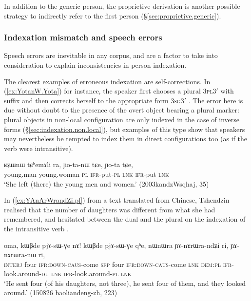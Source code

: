 In addition to the generic person, the proprietive derivation is another possible strategy to indirectly refer to the first person (§\ref{sec:proprietive.generic}).
 
\subsubsection{Indexation mismatch and speech errors} \label{sec:mismatch.errors}
Speech errors are inevitable in any corpus, and are a factor to take into consideration to explain inconsistencies in person indexation. 

The clearest examples of erroneous indexation are self-corrections. In (\ref{ex:YotanW.Yota}) for instance, the speaker first chooses a plural \textsc{3pl}\fl{}3$'$ with  suffix and then corrects herself to the appropriate form \textsc{3sg}\fl{}3$'$ . The error here is due without doubt to the presence of the overt object  bearing a plural marker: plural objects in non-local configuration are only indexed in the case of inverse forms (§\ref{sec:indexation.non.local}), but examples of this type show that speakers may nevertheless be tempted to index them in direct configurations too (as if the verb were intransitive).

\begin{exe}
\ex \label{ex:YotanW.Yota}
\gll  ʁʑɯnɯ tɕʰemɤli ra, ɲo-ta-nɯ tɕe, ɲo-ta tɕe, \\
young.man young.woman \textsc{pl} \textsc{ifr}-put-\textsc{pl} \textsc{lnk} \textsc{ifr}-put \textsc{lnk} \\
\glt `She left (there) the young men and women.' (2003kandzWsqhaj, 35)
\end{exe} 

In (\ref{ex:YAnArWrandZi.pl}) from a text translated from Chinese, Tshendzin realised that the number of daughters was different from what she had  remembered, and hesitated between the dual and the plural on the indexation of the intransitive verb .

\begin{exe}
\ex \label{ex:YAnArWrandZi.pl}
\gll oma, kɯβde pjɤ-sɯ-ɣe nɤ! kɯβde pjɤ-sɯ-ɣe qʰe, nɯnɯra ɲɤ-nɤrɯra-ndʑi ri, ɲɤ-nɤrɯra-nɯ ri, \\
\textsc{interj} four \textsc{ifr}:\textsc{down}-\textsc{caus}-come \textsc{sfp} four \textsc{ifr}:\textsc{down}-\textsc{caus}-come \textsc{lnk} \textsc{dem}:\textsc{pl} \textsc{ifr}-look.around-\textsc{du} \textsc{lnk} \textsc{ifr}-look.around-\textsc{pl} \textsc{lnk} \\
\glt `He sent four (of his daughters, not three), he sent four of them, and they looked around.' (150826 baoliandeng-zh, 223)
\end{exe} 

